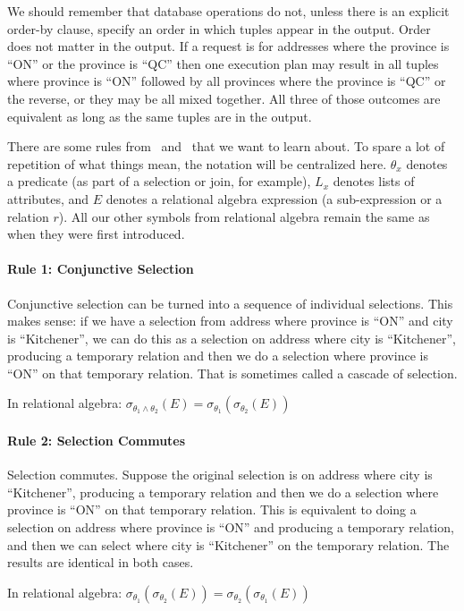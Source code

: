 We should remember that database operations do not, unless there is an explicit order-by clause, specify an order in which tuples appear in the output. Order does not matter in the output. If a request is for addresses where the province is ``ON'' or the province is ``QC'' then one execution plan may result in all tuples where province is ``ON'' followed by all provinces where the province is ``QC'' or the reverse, or they may be all mixed together. All three of those outcomes are equivalent as long as the same tuples are in the output.

There are some rules from~\cite{dsc} and~\cite{fds} that we want to learn about. To spare a lot of repetition of what things mean, the notation will be centralized here. $\theta_{x}$ denotes a predicate (as part of a selection or join, for example), $L_{x}$ denotes lists of attributes, and $E$ denotes a relational algebra expression (a sub-expression or a relation $r$). All our other symbols from relational algebra remain the same as when they were first introduced.

\paragraph{Rule 1: Conjunctive Selection}
Conjunctive selection can be turned into a sequence of individual selections. This makes sense: if we have a selection from address where province is ``ON'' and city is ``Kitchener'', we can do this as a selection on address where city is ``Kitchener'', producing a temporary relation and then we do a selection where province is ``ON'' on that temporary relation. That is sometimes called a cascade of selection.

In relational algebra: $\sigma_{\theta_{1} \wedge \theta_{2}}(E) = \sigma_{\theta_{1}}(\sigma_{\theta_{2}}(E))$


\paragraph{Rule 2: Selection Commutes}
Selection commutes. Suppose the original selection is on address where city is ``Kitchener'', producing a temporary relation and then we do a selection where province is ``ON'' on that temporary relation. This is equivalent to doing a selection on address where province is ``ON'' and producing a temporary relation, and then we can select where city is ``Kitchener'' on the temporary relation. The results are identical in both cases. 

In relational algebra: $\sigma_{\theta_{1}}(\sigma_{\theta_{2}}(E)) = \sigma_{\theta_{2}}(\sigma_{\theta_{1}}(E))$

